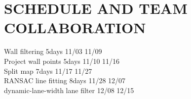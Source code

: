 \documentclass[letterpaper, 10 pt, conference]{ieeeconf}  %
\begin{document}
\section{SCHEDULE AND TEAM COLLABORATION}

Wall filtering	    5days	11/03	11/09\\
Project wall points	5days	11/10	11/16\\
Split map	        7days	11/17	11/27\\
RANSAC line fitting	8days	11/28	12/07\\
dynamic-lane-width lane filter 12/08 12/15\\

\addtolength{\textheight}{-12cm}   %



\end{document}
